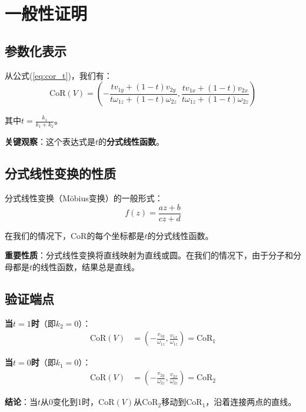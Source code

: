 \documentclass[12pt,a4paper]{article}
\begin{document}
\section{一般性证明}

\subsection{参数化表示}

从公式(\ref{eq:cor_t})，我们有：
\begin{equation}
\text{CoR}(V) = \left(-\frac{t v_{1y} + (1-t) v_{2y}}{t \omega_{1z} + (1-t) \omega_{2z}}, \frac{t v_{1x} + (1-t) v_{2x}}{t \omega_{1z} + (1-t) \omega_{2z}}\right)
\end{equation}

其中$t = \frac{k_1}{k_1 + k_2}$。

\textbf{关键观察}：这个表达式是$t$的\textbf{分式线性函数}。

\subsection{分式线性变换的性质}

分式线性变换（Möbius变换）的一般形式：
\begin{equation}
f(z) = \frac{az + b}{cz + d}
\end{equation}

在我们的情况下，CoR的每个坐标都是$t$的分式线性函数。

\textbf{重要性质}：分式线性变换将直线映射为直线或圆。在我们的情况下，由于分子和分母都是$t$的线性函数，结果总是直线。

\subsection{验证端点}

\textbf{当$t = 1$时}（即$k_2 = 0$）：
\begin{align}
\text{CoR}(V) &= \left(-\frac{v_{1y}}{\omega_{1z}}, \frac{v_{1x}}{\omega_{1z}}\right) = \text{CoR}_1
\end{align}

\textbf{当$t = 0$时}（即$k_1 = 0$）：
\begin{align}
\text{CoR}(V) &= \left(-\frac{v_{2y}}{\omega_{2z}}, \frac{v_{2x}}{\omega_{2z}}\right) = \text{CoR}_2
\end{align}

\textbf{结论}：当$t$从0变化到1时，$\text{CoR}(V)$从$\text{CoR}_2$移动到$\text{CoR}_1$，沿着连接两点的直线。
\end{document}
